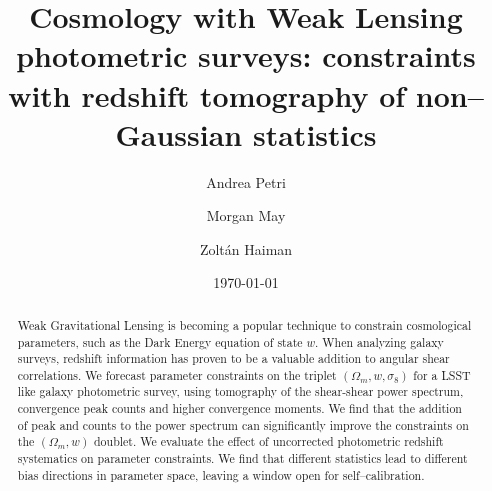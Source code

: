 \documentclass[reprint,aps,prd,superscriptaddress,showkeys,showpacs]{revtex4-1}
\begin{document}
\title{Cosmology with Weak Lensing photometric surveys: constraints with redshift tomography of non--Gaussian statistics}

\author{Andrea Petri}

\author{Morgan May}

\author{Zolt\'an Haiman}

\date{\today}

\label{firstpage}

\begin{abstract}
Weak Gravitational Lensing is becoming a popular technique to constrain cosmological parameters, such as the Dark Energy equation of state $w$. When analyzing galaxy surveys, redshift information has proven to be a valuable addition to angular shear correlations. We forecast parameter constraints on the triplet $(\Omega_m,w,\sigma_8)$ for a LSST like galaxy photometric survey, using tomography of the shear-shear power spectrum, convergence peak counts and higher convergence moments. We find that the addition of peak and counts to the power spectrum can significantly improve the constraints on the $(\Omega_m,w)$ doublet. We evaluate the effect of uncorrected photometric redshift systematics on parameter constraints. We find that different statistics lead to different bias directions in parameter space, leaving a window open for self--calibration. 
\end{abstract}



\maketitle


\end{document}
